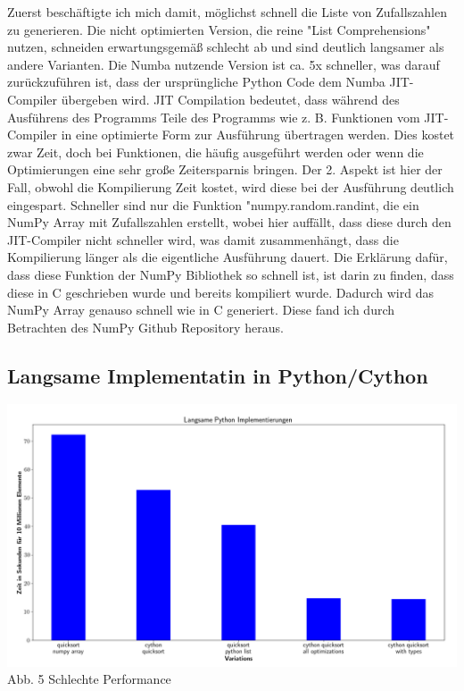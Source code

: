\documentclass[11pt,a4paper]{article}
\begin{document}
Zuerst beschäftigte ich mich damit, möglichst schnell die Liste von Zufallszahlen zu generieren.
Die nicht optimierten Version, die reine "List Comprehensions" nutzen, schneiden erwartungsgemäß schlecht ab
und sind deutlich langsamer als andere Varianten. Die Numba nutzende Version ist ca. 5x schneller,
was darauf zurückzuführen ist, dass der ursprüngliche Python Code dem Numba JIT-Compiler übergeben wird.
JIT Compilation bedeutet, dass während des Ausführens des Programms Teile des Programms wie z. B. Funktionen
vom JIT-Compiler in eine optimierte Form zur Ausführung übertragen werden. Dies kostet zwar Zeit, doch bei
Funktionen, die häufig ausgeführt werden oder wenn die Optimierungen eine sehr große Zeitersparnis bringen.
Der 2. Aspekt ist hier der Fall, obwohl die Kompilierung Zeit kostet, wird diese bei der Ausführung deutlich eingespart.
Schneller sind nur die Funktion "numpy.random.randint, die ein NumPy Array mit Zufallszahlen erstellt,
wobei hier auffällt, dass diese durch den JIT-Compiler nicht schneller wird, was damit zusammenhängt, dass die Kompilierung
länger als die eigentliche Ausführung dauert. Die Erklärung dafür, dass diese Funktion der NumPy Bibliothek
so schnell ist, ist darin zu finden, dass diese in C geschrieben wurde und bereits kompiliert wurde. Dadurch wird
das NumPy Array genauso schnell wie in C generiert. Diese fand ich durch Betrachten des NumPy Github Repository heraus.

\subsection{Langsame Implementatin in Python/Cython}

\begin{center}
    \hspace*{-1.5cm}\includegraphics[width=1.2\textwidth]{./diagramme/matplotlib/pythonlangsam.png}
    Abb. 5 Schlechte Performance
\end{center}
\end{document}
